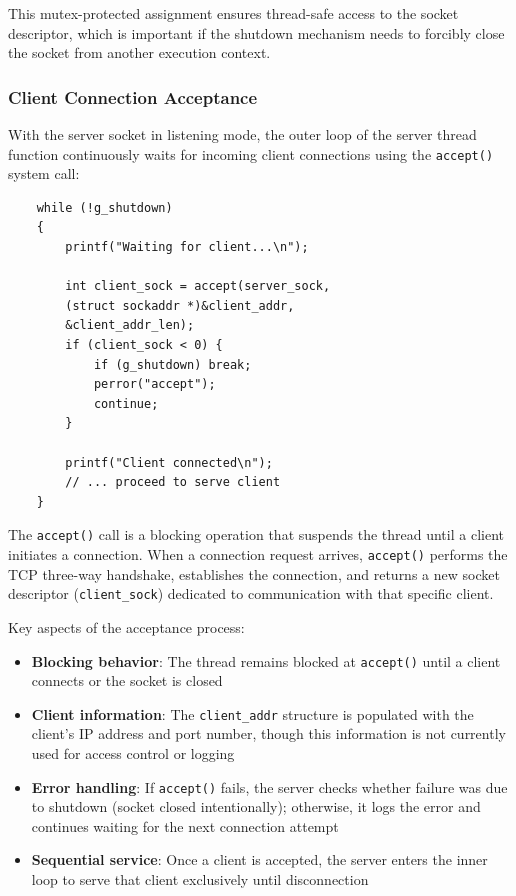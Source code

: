This mutex-protected assignment ensures thread-safe access to the socket descriptor, which is important if the shutdown mechanism needs to forcibly close the socket from another execution context.

\subsubsection{Client Connection Acceptance}

With the server socket in listening mode, the outer loop of the server thread function continuously waits for incoming client connections using the \texttt{accept()} system call:

\begin{verbatim}
	while (!g_shutdown)
	{
		printf("Waiting for client...\n");
		
		int client_sock = accept(server_sock,
		(struct sockaddr *)&client_addr,
		&client_addr_len);
		if (client_sock < 0) {
			if (g_shutdown) break;
			perror("accept");
			continue;
		}
		
		printf("Client connected\n");
		// ... proceed to serve client
	}
\end{verbatim}

The \texttt{accept()} call is a blocking operation that suspends the thread until a client initiates a connection. When a connection request arrives, \texttt{accept()} performs the TCP three-way handshake, establishes the connection, and returns a new socket descriptor (\texttt{client\_sock}) dedicated to communication with that specific client.

Key aspects of the acceptance process:

\begin{itemize}
	\item \textbf{Blocking behavior}: The thread remains blocked at \texttt{accept()} until a client connects or the socket is closed
	\item \textbf{Client information}: The \texttt{client\_addr} structure is populated with the client's IP address and port number, though this information is not currently used for access control or logging
	\item \textbf{Error handling}: If \texttt{accept()} fails, the server checks whether failure was due to shutdown (socket closed intentionally); otherwise, it logs the error and continues waiting for the next connection attempt
	\item \textbf{Sequential service}: Once a client is accepted, the server enters the inner loop to serve that client exclusively until disconnection
\end{itemize}

